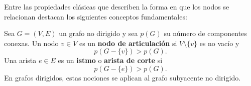             Entre las propiedades clásicas que describen la forma en que los nodos se relacionan destacan los siguientes conceptos fundamentales:

            \begin{definicion}
                Sea $G=(V,E)$ un grafo no dirigido y sea $p(G)$ su número de componentes conexas. Un nodo $v\in V$ es un \textbf{nodo de articulación} si $V\setminus\{v\}$ es no vacío y
                \[
                    p(G-\{v\})>p(G).
                \]
                Una arista $e\in E$ es un \textbf{istmo} o \textbf{arista de corte} si
                \[
                    p(G-\{e\})>p(G).
                \]
                En grafos dirigidos, estas nociones se aplican al grafo subyacente no dirigido.
            \end{definicion}

